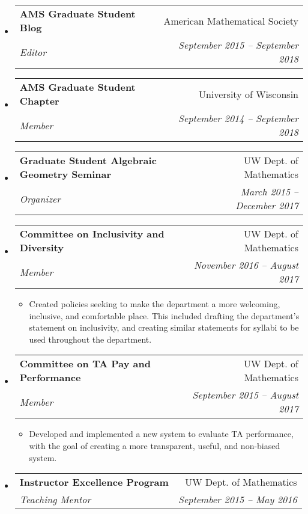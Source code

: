 \documentclass[letterpaper,11pt]{article}
\makeatletter
\newcommand{\resitem}[1]{\item #1 \vspace{-2pt}}
\newcommand{\resheading}[1]{\vspace{8pt}
  \parbox{\textwidth}{\setlength{\FrameSep}{\fboxsep}
    \begin{shaded}
\setlength{\fboxsep}{0pt}\framebox[\textwidth][l]{\setlength{\fboxsep}{4pt}\fcolorbox{shadecolorB}{shadecolorB}{\textbf{\sffamily{\mbox{~}\makebox[6.762in][l]{\large #1} \vphantom{p\^{E}}}}}}
    \end{shaded}
  }\vspace{-5pt}
}
\newcommand{\ressubheading}[4]{
\begin{tabular*}{6.5in}[t]{l@{\cftdotfill{\cftsecdotsep}\extracolsep{\fill}}r}
		\textbf{#1} & #2 \\
		\textit{#3} & \textit{#4} \\
\end{tabular*}\vspace{-6pt}}
\newcommand{\ressubheadingTalk}[2]{
\begin{tabular*}{6.5in}[t]{l@{\cftdotfill{\cftsecdotsep}\extracolsep{\fill}}r}
		#1 & #2 \\
\end{tabular*}\vspace{-6pt}}
\makeatother
\begin{document}
\begin{itemize}

\item 
	\ressubheading{AMS Graduate Student Blog}{American Mathematical Society}{Editor}{September 2015 -- September 2018}
	
\item 
	\ressubheading{AMS Graduate Student Chapter}{University of Wisconsin}{Member}{September 2014 -- September 2018}

\item 
	\ressubheading{Graduate Student Algebraic Geometry Seminar}{UW Dept. of Mathematics}{Organizer}{March 2015 -- December 2017}
		
\item 
	\ressubheading{Committee on Inclusivity and Diversity}{UW Dept. of Mathematics}{Member}{November 2016 -- August 2017}
	\begin{itemize}
		\resitem{Created policies seeking to make the department a more welcoming, inclusive, and comfortable place. This included drafting the department's statement on inclusivity, and creating similar statements for syllabi to be used throughout the department.}
	\end{itemize}

\item 
	\ressubheading{Committee on TA Pay and Performance}{UW Dept. of Mathematics}{Member}{September 2015 -- August 2017}
	\begin{itemize}
		\resitem{Developed and implemented a new system to evaluate TA performance, with the goal of creating a more transparent, useful, and non-biased system.}
	\end{itemize}
	
\item 
	\ressubheading{Instructor Excellence Program}{UW Dept. of Mathematics}{Teaching Mentor}{September 2015 -- May 2016}

\end{itemize}

%
%
%		
%		
%
\end{document}
